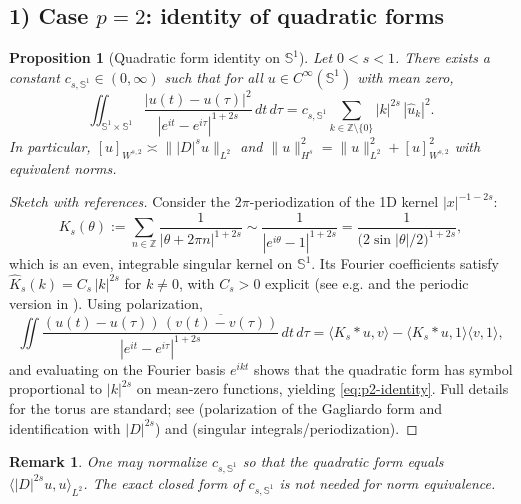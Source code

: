 \documentclass{amsart}
\newcounter{thm}
\newcounter{ex}
\newcounter{re}
\newtheorem{proposition}[thm]{Proposition}
\newtheorem{remark}[thm]{Remark}
\begin{document}
\subsection*{1) Case $p=2$: identity of quadratic forms}

\begin{proposition}[Quadratic form identity on $\mathbb S^1$]\label{prop:p2}
Let $0<s<1$. There exists a constant $c_{s,\mathbb S^1}\in(0,\infty)$ such that
for all $u\in C^\infty(\mathbb S^1)$ with mean zero,
\begin{equation}\label{eq:p2-identity}
\iint_{\mathbb S^1\times\mathbb S^1}
\frac{|u(t)-u(\tau)|^2}{|e^{it}-e^{i\tau}|^{1+2s}}\,dt\,d\tau
= c_{s,\mathbb S^1}\sum_{k\in\mathbb Z\setminus\{0\}} |k|^{2s}\,|\widehat u_k|^2.
\end{equation}
In particular, $[u]_{W^{s,2}}\asymp \||D|^s u\|_{L^2}$ and
$\|u\|_{H^s}^2=\|u\|_{L^2}^2+[u]_{W^{s,2}}^2$ with equivalent norms.
\end{proposition}

\begin{proof}[Sketch with references]
Consider the \(2\pi\)-periodization of the 1D kernel \(|x|^{-1-2s}\):
\[
K_s(\theta):=\sum_{n\in\mathbb Z}\frac{1}{|\theta+2\pi n|^{1+2s}}
\sim \frac{1}{|e^{i\theta}-1|^{1+2s}}
= \frac{1}{\big(2\sin|\theta|/2\big)^{1+2s}},
\]
which is an even, integrable singular kernel on \(\mathbb S^1\). Its Fourier
coefficients satisfy \(\widehat K_s(k)=C_s\,|k|^{2s}\) for \(k\neq0\), with
\(C_s>0\) explicit (see e.g. \cite[Prop.~3.6]{DiNezzaPV} and the periodic
version in \cite[Ch.~V]{SteinSI}). Using polarization,
\[
\iint \frac{(u(t)-u(\tau))\,\overline{(v(t)-v(\tau))}}{|e^{it}-e^{i\tau}|^{1+2s}}\,dt\,d\tau
= \langle K_s*u, v\rangle - \langle K_s*u,1\rangle\langle v,1\rangle,
\]
and evaluating on the Fourier basis \(e^{ikt}\) shows that the quadratic form
has symbol proportional to \(|k|^{2s}\) on mean-zero functions, yielding
\eqref{eq:p2-identity}. Full details for the torus are standard; see
\cite[§7]{DiNezzaPV} (polarization of the Gagliardo form and identification with
\(|D|^{2s}\)) and \cite[Ch.~V]{SteinSI} (singular integrals/periodization).
\end{proof}

\begin{remark}
One may normalize \(c_{s,\mathbb S^1}\) so that the quadratic form equals
\(\langle |D|^{2s}u,u\rangle_{L^2}\). The exact closed form of \(c_{s,\mathbb S^1}\)
is not needed for norm equivalence.
\end{remark}
\end{document}
